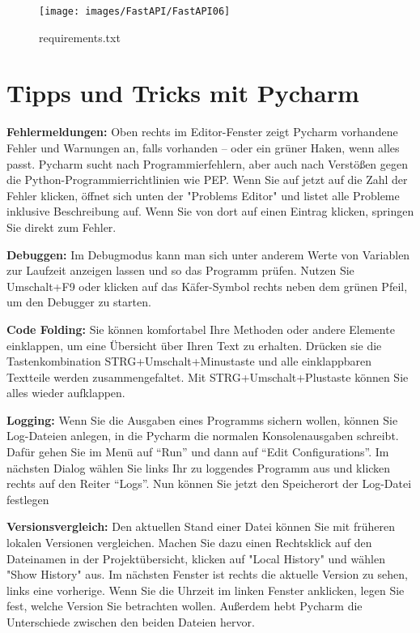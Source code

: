 \begin{figure}
    \texttt{[image: images/FastAPI/FastAPI06]}
    \caption{requirements.txt} \label{FastAPI06}
\end{figure}

\section{Tipps und Tricks mit Pycharm}

\textbf{Fehlermeldungen:} Oben rechts im Editor-Fenster zeigt Pycharm vorhandene Fehler und Warnungen an, falls vorhanden – oder ein grüner Haken, wenn alles passt. Pycharm sucht nach Programmierfehlern, aber auch nach Verstößen gegen die Python-Programmierrichtlinien wie PEP. Wenn Sie auf jetzt auf die Zahl der Fehler klicken, öffnet sich unten der "Problems Editor" und listet alle Probleme inklusive Beschreibung auf. Wenn Sie von dort auf einen Eintrag klicken, springen Sie direkt zum Fehler.

\medskip

\textbf{Debuggen:} Im Debugmodus kann man sich unter anderem Werte von Variablen zur Laufzeit anzeigen lassen und so das Programm prüfen. Nutzen Sie Umschalt+F9 oder klicken auf das Käfer-Symbol rechts neben dem grünen Pfeil, um den Debugger zu starten.

\medskip

\textbf{Code Folding:} Sie können komfortabel Ihre Methoden oder andere Elemente einklappen, um eine Übersicht über Ihren Text zu erhalten. Drücken sie die Tastenkombination STRG+Umschalt+Minustaste und alle einklappbaren Textteile werden zusammengefaltet. Mit STRG+Umschalt+Plustaste können Sie alles wieder aufklappen.

\medskip

\textbf{Logging:} Wenn Sie die Ausgaben eines Programms sichern wollen, können Sie Log-Dateien anlegen, in die Pycharm die normalen Konsolenausgaben schreibt. Dafür gehen Sie im Menü auf ``Run'' und dann auf ``Edit Configurations''. Im nächsten Dialog wählen Sie links Ihr zu loggendes Programm aus und klicken rechts auf den Reiter ``Logs''. Nun können Sie jetzt den Speicherort der Log-Datei festlegen

\medskip

\textbf{Versionsvergleich:} Den aktuellen Stand einer Datei können Sie mit früheren lokalen Versionen vergleichen. Machen Sie dazu einen Rechtsklick auf den Dateinamen in der Projektübersicht, klicken auf "Local History" und wählen "Show History" aus. Im nächsten Fenster ist rechts die aktuelle Version zu sehen, links eine vorherige. Wenn Sie die Uhrzeit im linken Fenster anklicken, legen Sie fest, welche Version Sie betrachten wollen. Außerdem hebt Pycharm die Unterschiede zwischen den beiden Dateien hervor.

